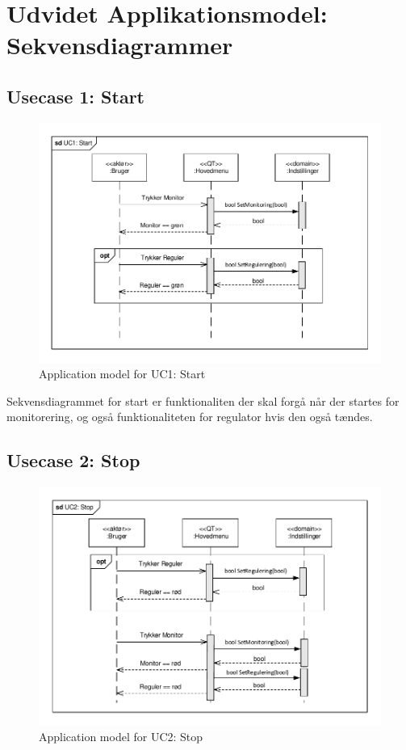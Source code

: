 \section{Udvidet Applikationsmodel: Sekvensdiagrammer}

\subsection{Usecase 1: Start}

\begin{figure}[!h]
\centering 
\includegraphics[width={\textwidth}, trim=0 0 0 0, clip=true] {../fig/SD_autoGreen_UC_1_Start.pdf}
\caption{Application model for UC1: Start}
\label{fig:SD_UC1}
\end{figure}

Sekvensdiagrammet for start er funktionaliten der skal forgå når der startes for monitorering, og også funktionaliteten for regulator hvis den også tændes.

\clearpage

\subsection{Usecase 2: Stop}

\begin{figure}[!h]
\centering 
\includegraphics[width={\textwidth}, trim=0 0 0 0, clip=true] {../fig/SD_autoGreen_UC_2_Stop.pdf}
\caption{Application model for UC2: Stop}
\label{fig:SD_UC2}
\end{figure}

